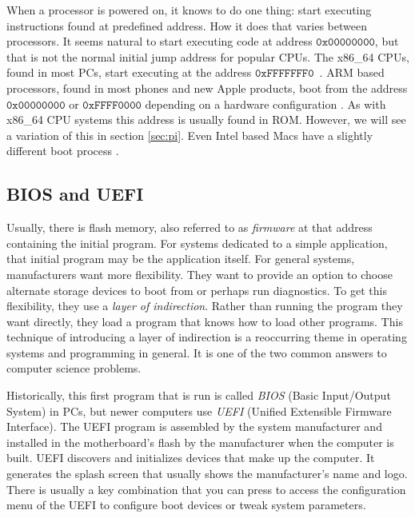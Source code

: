 \documentclass{article}
\begin{document}
When a processor is powered on, it knows to do one thing: start executing instructions found at predefined address.
How it does that varies between processors.
It seems natural to start executing code at address $\mathtt{0x00000000}$, but that is not the normal initial jump address for popular CPUs.
The x86\_64 CPUs, found in most PCs, start executing at the address $\mathtt{0xFFFFFFF0}$~\cite{intel:asdm}.
ARM based processors, found in most phones and new Apple products, boot from the address $\mathtt{0x00000000}$ or $\mathtt{0xFFFF0000}$ depending on a hardware configuration \cite{arm}.
As with x86\_64 CPU systems this address is usually found in ROM.
However, we will see a variation of this in section \ref{sec:pi}.
Even Intel based Macs have a slightly different boot process \cite{macboot}.

\subsection{BIOS and UEFI}
Usually, there is flash memory, also referred to as \emph{firmware} at that address containing the initial program.
For systems dedicated to a simple application, that initial program may be the application itself.
For general systems, manufacturers want more flexibility.
They want to provide an option to choose alternate storage devices to boot from or perhaps run diagnostics.
To get this flexibility, they use a \emph{layer of indirection}.
Rather than running the program they want directly, they load a program that knows how to load other programs.
This technique of introducing a layer of indirection is a reoccurring theme in operating systems and programming in general.
It is one of the two common answers to computer science problems.

Historically, this first program that is run is called \emph{BIOS} (Basic Input/Output System) in PCs, but newer computers use \emph{UEFI} (Unified Extensible Firmware Interface).
The UEFI program is assembled by the system manufacturer and installed in the motherboard's flash by the manufacturer when the computer is built.
UEFI discovers and initializes devices that make up the computer.
It generates the splash screen that usually shows the manufacturer's name and logo.
There is usually a key combination that you can press to access the configuration menu of the UEFI to configure boot devices or tweak system parameters.
\end{document}
